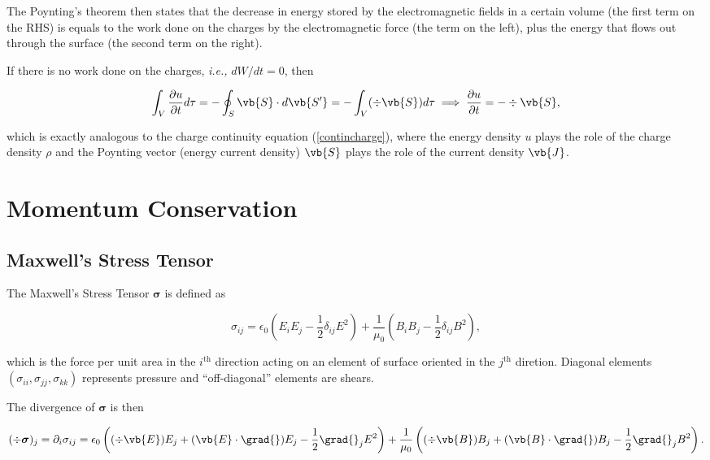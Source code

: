 \documentclass[english,a4paper,12pt]{report}
\begin{document}
The Poynting's theorem then states that the decrease in energy stored by the electromagnetic fields in a certain volume (the first term on the RHS) is equals to the work done on the charges by the electromagnetic force (the term on the left), plus the energy that flows out through the surface (the second term on the right).

If there is no work done on the charges, \textit{i.e.,} \(dW /dt = 0\), then

\begin{equation}
    \int_{V}^{} \frac{\partial u}{\partial t} d\tau = -\oint_{S} \vb{S} \cdot d\vb{S'} = -\int_{V}^{} (\div{\vb{S} } ) d\tau  \implies \frac{\partial u}{\partial t} = -\div{\vb{S} },   \label{continenergy} 
\end{equation}

which is exactly analogous to the charge continuity equation (\cref{contincharge}), where the energy density \(u\) plays the role of the charge density \(\rho \) and the Poynting vector (energy current density) \(\vb{S} \) plays the role of the current density \(\vb{J} \). 

\section{Momentum Conservation}

\subsection{Maxwell's Stress Tensor}

The Maxwell's Stress Tensor \(\boldsymbol{\sigma } \) is defined as 

\begin{equation}
    \sigma _{ij}  = \epsilon_0 \left( E_{i}E_{j} - \frac{1}{2} \delta _{ij} E^2     \right) + \frac{1}{\mu_0 }\left( B_{i}B_{j} - \frac{1}{2} \delta _{ij}B^2     \right),
\end{equation}

which is the force per unit area in the \(i^{\text{th}} \) direction acting on an element of surface oriented in the \(j^{\text{th}} \) diretion. Diagonal elements \((\sigma _{ii}, \sigma _{jj}, \sigma _{kk}  )\) represents pressure and ``off-diagonal'' elements are shears.

The divergence of \(\boldsymbol{\sigma }  \) is then 

\begin{equation}
    \begin{aligned}
        (\div{\boldsymbol{\sigma }  } )_{j} =  \partial _{i}\sigma _{ij} = \epsilon_0 \left( (\div{\vb{E} } )E_{j} + (\vb{E} \cdot \grad{} )E_{j} - \frac{1}{2}\grad{}_{j}E^2      \right) + \frac{1}{\mu_0 } \left( (\div{\vb{B} } )B_{j}+(\vb{B} \cdot \grad{} )B_{j}-\frac{1}{2}\grad{}_{j}B^2      \right).   
    \end{aligned}
\end{equation}
\end{document}

